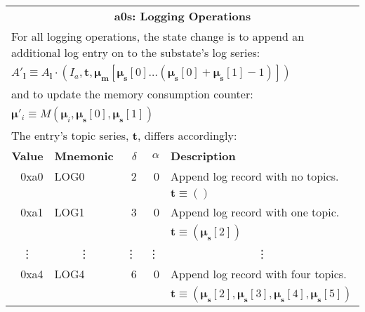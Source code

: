 \documentclass[9pt,oneside]{amsart}
\begin{document}
\begin{tabular*}{\columnwidth}[h]{rlrrl}
\toprule
\multicolumn{5}{c}{\textbf{a0s: Logging Operations}} \vspace{5pt} \\
\multicolumn{5}{l}{For all logging operations, the state change is to append an additional log entry on to the substate's log series:}\\
\multicolumn{5}{l}{$A'_\mathbf{l} \equiv A_\mathbf{l} \cdot (I_a, \mathbf{t}, \boldsymbol{\mu}_\mathbf{m}[ \boldsymbol{\mu}_\mathbf{s}[0] \dots (\boldsymbol{\mu}_\mathbf{s}[0] + \boldsymbol{\mu}_\mathbf{s}[1] - 1) ])$}\\
\multicolumn{5}{l}{and to update the memory consumption counter:}\\
\multicolumn{5}{l}{$\boldsymbol{\mu}'_i \equiv M(\boldsymbol{\mu}_i, \boldsymbol{\mu}_\mathbf{s}[0], \boldsymbol{\mu}_\mathbf{s}[1])$}\\
\multicolumn{5}{l}{The entry's topic series, $\mathbf{t}$, differs accordingly:}\vspace{5pt} \\
\textbf{Value} & \textbf{Mnemonic} & $\delta$ & $\alpha$ & \textbf{Description} \vspace{5pt} \\
0xa0 & {\small LOG0} & 2 & 0 & Append log record with no topics. \\
&&&& $\mathbf{t} \equiv ()$ \\
\midrule
0xa1 & {\small LOG1} & 3 & 0 & Append log record with one topic. \\
&&&& $\mathbf{t} \equiv (\boldsymbol{\mu}_\mathbf{s}[2])$ \\
\midrule
\multicolumn{1}{c}{\vdots} & \multicolumn{1}{c}{\vdots} & \vdots & \vdots & \multicolumn{1}{c}{\vdots} \\
\midrule
0xa4 & {\small LOG4} & 6 & 0 & Append log record with four topics. \\
&&&& $\mathbf{t} \equiv (\boldsymbol{\mu}_\mathbf{s}[2], \boldsymbol{\mu}_\mathbf{s}[3], \boldsymbol{\mu}_\mathbf{s}[4], \boldsymbol{\mu}_\mathbf{s}[5])$ \\
\bottomrule
\end{tabular*}
\end{document}
